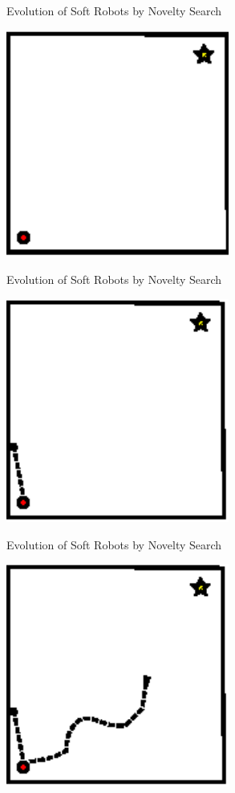 \documentclass[6pt]{beamer}
\begin{document}
\begin{frame}{{\scriptsize Evolution of Soft Robots by} Novelty Search}
\begin{center}
\includegraphics[width=0.55\textwidth]{../Figures/Misc/mazeEasy.eps}
\end{center}
\end{frame}

\begin{frame}{{\scriptsize Evolution of Soft Robots by} Novelty Search}
\begin{center}
\includegraphics[width=0.55\textwidth]{../Figures/Misc/mazeEasy1.eps}
\end{center}
\end{frame}

\begin{frame}{{\scriptsize Evolution of Soft Robots by} Novelty Search}
\begin{center}
\includegraphics[width=0.55\textwidth]{../Figures/Misc/mazeEasy2.eps}
\end{center}
\end{frame}
\end{document}
